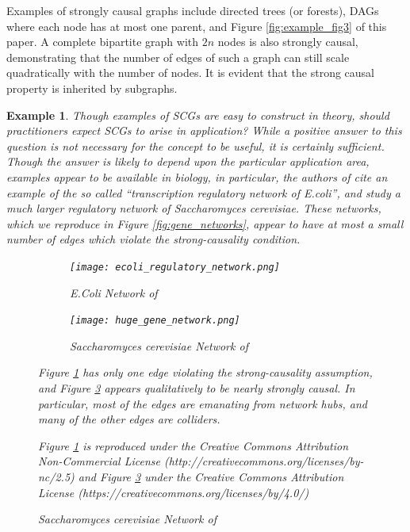 \documentclass{statsoc}
\newtheorem{example}{Example}
\begin{document}
Examples of strongly causal graphs include directed trees (or
forests), DAGs where each node has at most one parent, and Figure
\ref{fig:example_fig3} of this paper.  A complete bipartite graph with
$2n$ nodes is also strongly causal, demonstrating that the number of
edges of such a graph can still scale quadratically with the number of
nodes.  It is evident that the strong causal property is inherited by
subgraphs.

\begin{example}
  Though examples of SCGs are easy to construct in theory, should
  practitioners expect SCGs to arise in application?  While a positive
  answer to this question is not \textit{necessary} for the concept to
  be useful, it is certainly sufficient.  Though the answer is likely
  to depend upon the particular application area, examples appear to
  be available in biology, in particular, the authors of
  \cite{discovering_graphical_Granger_causality_using_the_truncating_lasso_penalty}
  cite an example of the so called ``transcription regulatory network
  of \textit{E.coli}'', and
  \cite{learning_genome_scale_regulatory_networks} study a much larger
  regulatory network of \textit{Saccharomyces cerevisiae}.  These
  networks, which we reproduce in Figure \ref{fig:gene_networks},
  appear to have at most a small number of edges which violate the
  strong-causality condition.

  \begin{figure}[h]
    \centering
    \caption{Transcription Regulatory Networks}
    \label{fig:gene_networks}
    \begin{subfigure}[b]{0.45\textwidth}
      \caption{\textit{E.Coli} Network of
        \cite{discovering_graphical_Granger_causality_using_the_truncating_lasso_penalty}}
      \label{fig:gene_network1}
      \texttt{[image: ecoli\_regulatory\_network.png]}
    \end{subfigure}
    \begin{subfigure}[b]{0.45\textwidth}
      \caption{\textit{Saccharomyces cerevisiae} Network of
        \cite{learning_genome_scale_regulatory_networks}}
      \label{fig:gene_network2}
      \texttt{[image: huge\_gene\_network.png]}
    \end{subfigure}

    {\footnotesize Figure \ref{fig:gene_network1} has only one edge
      violating the strong-causality assumption, and Figure
      \ref{fig:gene_network2} appears qualitatively to be nearly
      strongly causal.  In particular, most of the edges are emanating
      from network hubs, and many of the other edges are colliders.

      Figure \ref{fig:gene_network1}
      is reproduced under the Creative Commons Attribution
      Non-Commercial License
      (http://creativecommons.org/licenses/by-nc/2.5) and Figure
      \ref{fig:gene_network2} under the Creative Commons Attribution
      License (https://creativecommons.org/licenses/by/4.0/)}
  \end{figure}
\end{example}
\end{document}

